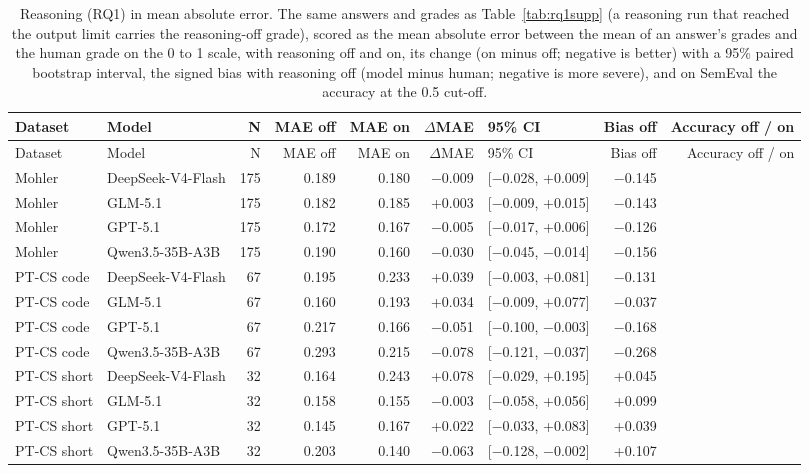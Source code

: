 \documentclass[10pt]{article}
\begin{document}
\begingroup\footnotesize
\begin{longtable}{llrrrrlrr}
\caption{Reasoning (RQ1) in mean absolute error. The same answers and grades as Table~\ref{tab:rq1supp} (a reasoning run that reached the output limit carries the reasoning-off grade), scored as the mean absolute error between the mean of an answer's grades and the human grade on the 0 to 1 scale, with reasoning off and on, its change (on minus off; negative is better) with a 95\% paired bootstrap interval, the signed bias with reasoning off (model minus human; negative is more severe), and on SemEval the accuracy at the 0.5 cut-off.}\\
\hline
Dataset & Model & N & MAE off & MAE on & $\Delta$MAE & 95\% CI & Bias off & Accuracy off / on \\ \hline
\endfirsthead
\hline
Dataset & Model & N & MAE off & MAE on & $\Delta$MAE & 95\% CI & Bias off & Accuracy off / on \\ \hline
\endhead
Mohler & DeepSeek-V4-Flash & 175 & 0.189 & 0.180 & $-$0.009 & [$-$0.028, +0.009] & $-$0.145 &  \\
Mohler & GLM-5.1 & 175 & 0.182 & 0.185 & +0.003 & [$-$0.009, +0.015] & $-$0.143 &  \\
Mohler & GPT-5.1 & 175 & 0.172 & 0.167 & $-$0.005 & [$-$0.017, +0.006] & $-$0.126 &  \\
Mohler & Qwen3.5-35B-A3B & 175 & 0.190 & 0.160 & $-$0.030 & [$-$0.045, $-$0.014] & $-$0.156 &  \\
PT-CS code & DeepSeek-V4-Flash & 67 & 0.195 & 0.233 & +0.039 & [$-$0.003, +0.081] & $-$0.131 &  \\
PT-CS code & GLM-5.1 & 67 & 0.160 & 0.193 & +0.034 & [$-$0.009, +0.077] & $-$0.037 &  \\
PT-CS code & GPT-5.1 & 67 & 0.217 & 0.166 & $-$0.051 & [$-$0.100, $-$0.003] & $-$0.168 &  \\
PT-CS code & Qwen3.5-35B-A3B & 67 & 0.293 & 0.215 & $-$0.078 & [$-$0.121, $-$0.037] & $-$0.268 &  \\
PT-CS short & DeepSeek-V4-Flash & 32 & 0.164 & 0.243 & +0.078 & [$-$0.029, +0.195] & +0.045 &  \\
PT-CS short & GLM-5.1 & 32 & 0.158 & 0.155 & $-$0.003 & [$-$0.058, +0.056] & +0.099 &  \\
PT-CS short & GPT-5.1 & 32 & 0.145 & 0.167 & +0.022 & [$-$0.033, +0.083] & +0.039 &  \\
PT-CS short & Qwen3.5-35B-A3B & 32 & 0.203 & 0.140 & $-$0.063 & [$-$0.128, $-$0.002] & +0.107 &  \\

\end{longtable}
\end{document}
